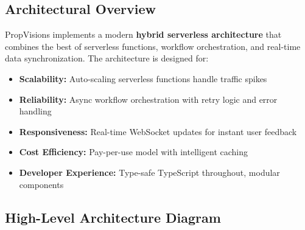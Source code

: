 \documentclass[11pt,a4paper]{article}
\begin{document}
\subsection{Architectural Overview}

PropVisions implements a modern \textbf{hybrid serverless architecture} that combines the best of serverless functions, workflow orchestration, and real-time data synchronization. The architecture is designed for:

\begin{itemize}
  \item \textbf{Scalability:} Auto-scaling serverless functions handle traffic spikes
  \item \textbf{Reliability:} Async workflow orchestration with retry logic and error handling
  \item \textbf{Responsiveness:} Real-time WebSocket updates for instant user feedback
  \item \textbf{Cost Efficiency:} Pay-per-use model with intelligent caching
  \item \textbf{Developer Experience:} Type-safe TypeScript throughout, modular components
\end{itemize}

\subsection{High-Level Architecture Diagram}
\end{document}
